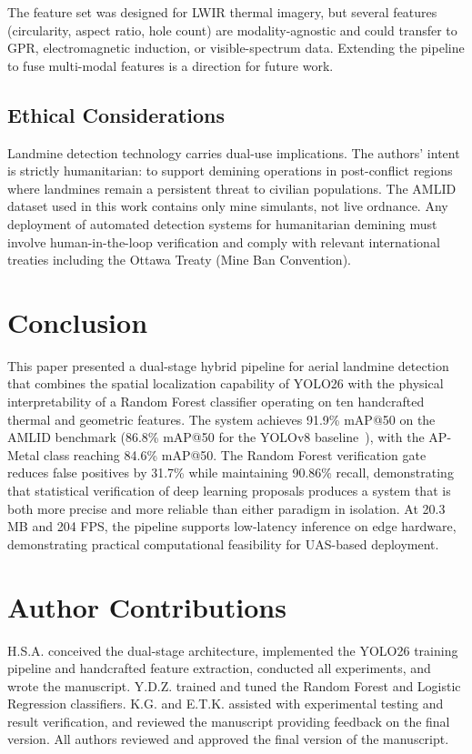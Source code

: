 \documentclass[conference]{IEEEtran}
\begin{document}
The feature set was designed for LWIR thermal imagery, but several features (circularity, aspect ratio, hole count) are modality-agnostic and could transfer to GPR, electromagnetic induction, or visible-spectrum data. Extending the pipeline to fuse multi-modal features is a direction for future work.

\subsection{Ethical Considerations}

Landmine detection technology carries dual-use implications. The authors' intent is strictly humanitarian: to support demining operations in post-conflict regions where landmines remain a persistent threat to civilian populations. The AMLID dataset used in this work contains only mine simulants, not live ordnance. Any deployment of automated detection systems for humanitarian demining must involve human-in-the-loop verification and comply with relevant international treaties including the Ottawa Treaty (Mine Ban Convention).

\section{Conclusion}

This paper presented a dual-stage hybrid pipeline for aerial landmine detection that combines the spatial localization capability of YOLO26 with the physical interpretability of a Random Forest classifier operating on ten handcrafted thermal and geometric features. The system achieves 91.9\% mAP@50 on the AMLID benchmark (86.8\% mAP@50 for the YOLOv8 baseline~\cite{gallagher2025}), with the AP-Metal class reaching 84.6\% mAP@50. The Random Forest verification gate reduces false positives by 31.7\% while maintaining 90.86\% recall, demonstrating that statistical verification of deep learning proposals produces a system that is both more precise and more reliable than either paradigm in isolation. At 20.3 MB and 204 FPS, the pipeline supports low-latency inference on edge hardware, demonstrating practical computational feasibility for UAS-based deployment.

\section*{Author Contributions}

H.S.A. conceived the dual-stage architecture, implemented the YOLO26 training pipeline and handcrafted feature extraction, conducted all experiments, and wrote the manuscript. Y.D.Z. trained and tuned the Random Forest and Logistic Regression classifiers. K.G. and E.T.K. assisted with experimental testing and result verification, and reviewed the manuscript providing feedback on the final version. All authors reviewed and approved the final version of the manuscript.
\end{document}
